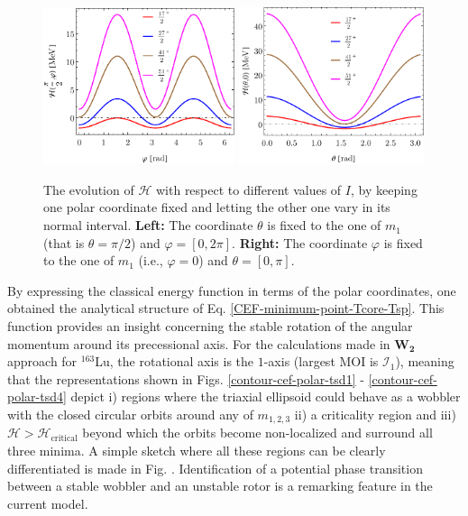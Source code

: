 \begin{figure}
    \centering
    \includegraphics[width=0.5\textwidth]{Chapters/Figures/parity-partners-plots/H-minimal-m1-phi.pdf}
    \includegraphics[width=0.485\textwidth]{Chapters/Figures/parity-partners-plots/H-minimal-m1-theta.pdf}
    \caption{The evolution of $\mathcal{H}$ with respect to different values of $I$, by keeping one polar coordinate fixed and letting the other one vary in its normal interval. \textbf{Left:} The coordinate $\theta$ is fixed to the one of $m_1$ (that is $\theta=\pi/2$) and $\varphi=[0,2\pi]$. \textbf{Right:} The coordinate $\varphi$ is fixed to the one of $m_1$ (i.e., $\varphi=0$) and $\theta=[0,\pi]$.}
    \label{CEF-theta-phi-dependence}
\end{figure}

By expressing the classical energy function in terms of the polar coordinates, one obtained the analytical structure of Eq. \ref{CEF-minimum-point-Tcore-Tsp}. This function provides an insight concerning the stable rotation of the angular momentum around its precessional axis. For the calculations made in $\mathbf{W_2}$ approach for $^{163}$Lu, the rotational axis is the $1$-axis (largest MOI is $\mathcal{I}_1$), meaning that the representations shown in Figs. \ref{contour-cef-polar-tsd1} - \ref{contour-cef-polar-tsd4} depict i) regions where the triaxial ellipsoid could behave as a wobbler with the closed circular orbits around any of $m_{1,2,3}$ ii) a criticality region and iii) $\mathcal{H}>\mathcal{H}_\text{critical}$ beyond which the orbits become non-localized and surround all three minima. A simple sketch where all these regions can be clearly differentiated is made in Fig. . Identification of a potential phase transition between a stable wobbler and an unstable rotor is a remarking feature in the current model. 